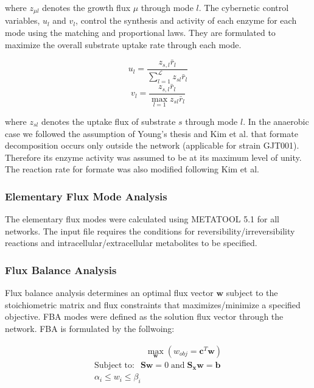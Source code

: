 \documentclass[10pt,twocolumn,twoside,final]{IEEEtran}
\begin{document}
where $z_{\mu l}$ denotes the growth flux $\mu$ through mode $l$. 
The cybernetic control variables, $u_{l}$ and $v_{l}$, control the synthesis and activity of each enzyme for each mode using the matching and proportional laws\cite{2007_young_ramkrishna_BiotechProg}. 
They are formulated to maximize the overall substrate uptake rate through each mode. 

\begin{equation}
	u_{l}  = \frac{z_{s,l}\bar{r}_{l}}{\sum_{l = 1}^{\mathcal{L}}z_{sl}\bar{r}_{l}} 
\end{equation}
\begin{equation}
	v_{l} = \frac{z_{s,l}\bar{r}_{l}}{\max_{l=1} z_{sl}\bar{r}_{l}}
\end{equation}

where $z_{sl}$ denotes the uptake flux of substrate $s$ through mode $l$. 
In the anaerobic case we followed the assumption of Young's thesis\cite{2005_Young} and Kim et al.\cite{2008_kim_varner_ramkrishna_BiotechProg} that formate decomposition occurs only outside the network (applicable for strain GJT001). 
Therefore its enzyme activity was assumed to be at its maximum level of unity. 
The reaction rate for formate was also modified following Kim et al.\cite{2008_kim_varner_ramkrishna_BiotechProg}  

\subsubsection*{Elementary Flux Mode Analysis}
The elementary flux modes were calculated using METATOOL 5.1\cite{2006_vonKamp_Metatool} for all networks. 
The input file requires the conditions for reversibility/irreversibility reactions and intracellular/extracellular metabolites to be specified. 

\subsubsection*{Flux Balance Analysis}
Flux balance analysis determines an optimal flux vector $\mathbf{w}$ subject to the stoichiometric matrix and flux constraints that maximizes/minimize a specified objective. 
FBA modes were defined as the solution flux vector through the network.
FBA is formulated by the follwoing:

\begin{equation}
 \begin{multlined}
	\qquad \qquad \qquad \max_{\boldsymbol{w}}{} \! \left( w_{obj} = \boldsymbol{c}^T \boldsymbol{w} \right) \\
	\mathrm{Subject \; to:}
	 \; \; \mathbf{S}\mathbf{w}=0 \mathrm{\; and \;} \mathbf{S_{x}}\mathbf{w} = \mathbf{b} \\ 
\alpha_i \leq w_i \leq \beta_i  \qquad
 \end{multlined}
\end{equation}
\end{document}
